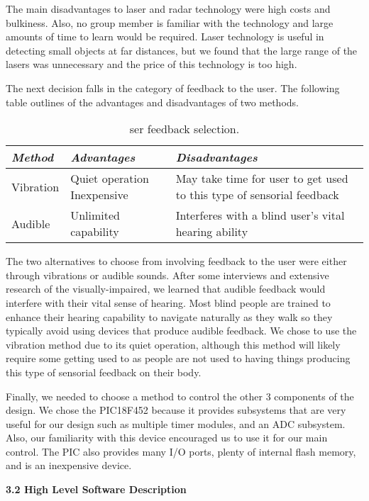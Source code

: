 The main disadvantages to laser and radar technology were high costs and
bulkiness. Also, no group member is familiar with the technology and
large amounts of time to learn would be required. Laser technology is
useful in detecting small objects at far distances, but we found that
the large range of the lasers was unnecessary and the price of this
technology is too high.

The next decision falls in the category of feedback to the user. The
following table outlines of the advantages and disadvantages of two
methods.

\begin{table}[h]
\caption{ser feedback selection.}
\label{table:<context>}
\begin{tabular}{|m{3cm}|m{3cm}|m{3cm}|} \hline
\emph{\textbf{Method}} & \emph{\textbf{Advantages}} & \emph{\textbf{Disadvantages}} \\ \hline
Vibration & Quiet operation Inexpensive & May take time for user to get used to this type of
sensorial feedback \\ \hline
Audible & Unlimited capability & Interferes with a blind user's vital
hearing ability \\ \hline
\end{tabular}
\end{table}

The two alternatives to choose from involving feedback to the user were
either through vibrations or audible sounds. After some interviews and
extensive research of the visually-impaired, we learned that audible
feedback would interfere with their vital sense of hearing. Most blind
people are trained to enhance their hearing capability to navigate
naturally as they walk so they typically avoid using devices that
produce audible feedback. We chose to use the vibration method due to
its quiet operation, although this method will likely require some
getting used to as people are not used to having things producing this
type of sensorial feedback on their body.

Finally, we needed to choose a method to control the other 3 components
of the design. We chose the PIC18F452 because it provides subsystems
that are very useful for our design such as multiple timer modules, and
an ADC subsystem. Also, our familiarity with this device encouraged us
to use it for our main control. The PIC also provides many I/O ports,
plenty of internal flash memory, and is an inexpensive device.


 \textbf{3.2 High Level Software Description}

